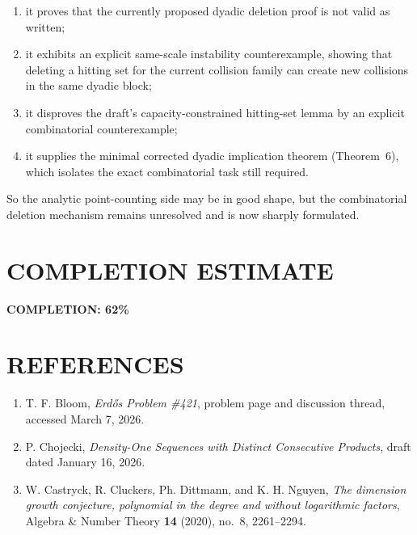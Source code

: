 \begin{enumerate}
\item it proves that the currently proposed dyadic deletion proof is not valid as written;
\item it exhibits an explicit same-scale instability counterexample, showing that deleting a hitting set for the current collision family can create new collisions in the same dyadic block;
\item it disproves the draft's capacity-constrained hitting-set lemma by an explicit combinatorial counterexample;
\item it supplies the minimal corrected dyadic implication theorem (Theorem~6), which isolates the exact combinatorial task still required.
\end{enumerate}

So the analytic point-counting side may be in good shape, but the combinatorial deletion mechanism remains unresolved and is now sharply formulated.

\section{COMPLETION ESTIMATE}

\noindent \textbf{COMPLETION: 62\%}

\section{REFERENCES}

\begin{enumerate}
\item T. F. Bloom, \emph{Erd\H{o}s Problem \#421}, problem page and discussion thread, accessed March 7, 2026.
\item P. Chojecki, \emph{Density-One Sequences with Distinct Consecutive Products}, draft dated January 16, 2026.
\item W. Castryck, R. Cluckers, Ph. Dittmann, and K. H. Nguyen, \emph{The dimension growth conjecture, polynomial in the degree and without logarithmic factors}, Algebra \& Number Theory \textbf{14} (2020), no.~8, 2261--2294.
\end{enumerate}

